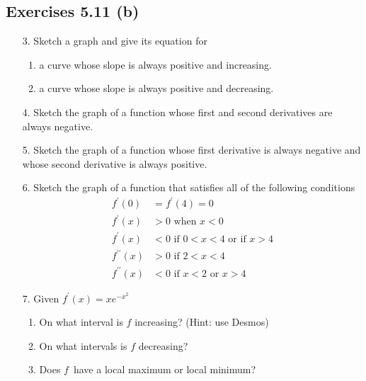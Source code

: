 \subsection{Exercises 5.11 (b)}
\begin{enumerate}
	\item [3.] Sketch a graph and give its equation for 
	
	
	\begin{enumerate}
		\item a curve whose slope is always positive and increasing. 
		
		\item a
		curve whose slope is always positive and decreasing. \end{enumerate}
	
	
	\item [4.]
	Sketch the graph of a function whose first and second derivatives are always negative. 
	
	\item [5.]
	Sketch the graph of a function whose first derivative is always negative and whose second derivative is always positive. 
	
	\item [6.]
	Sketch the graph of a function that satisfies all of the following conditions
	\begin{align*}f^{ \prime } (0) &  = f^{ \prime } (4) =0 \\
	f^{ \prime } (x) &  >  0\text{ when }x <0 \\
	f^{ \prime } (x) &  < 0\text { if }0 <x <4\text{ or if }x >4 \\
	f^{ \prime  \prime } (x) &  >  0\text{ if }2 <x <4 \\
	f^{ \prime  \prime } (x) &  <  0\text{ if }x <2\text{ or }x >4\end{align*}
	
	\item [7.] Given $f^{ \prime } (x) =x e^{ -x^{2}}$ 
	
	
	\begin{enumerate}
		\item On what interval is $f$ increasing? (Hint: use Desmos) 
		
		\item On what intervals is $f$ decreasing? 
		
		\item Does $f$\ have a local maximum or local minimum? \end{enumerate}
\end{enumerate}


